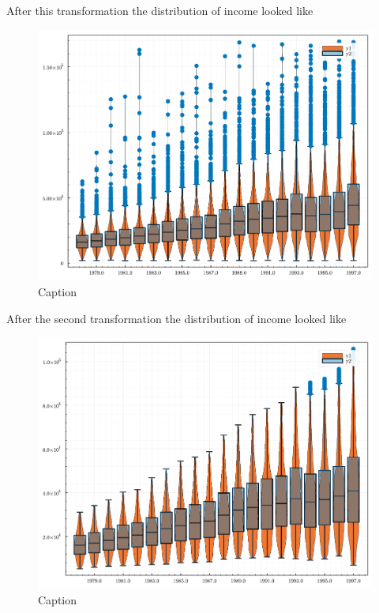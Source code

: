 \documentclass[12pt]{article}
\begin{document}
After this transformation the distribution of income looked like 
\begin{figure}[h*]
    \centering
    \includegraphics[scale = .5]{04 - 2022 Fall/Econ 810 Advanded Macroeconomic Theory/Part 1/PS 1/document/figures/data_outliers.pdf}
    \caption{Caption}
    \label{fig:my_label}

\end{figure}
After the second transformation the distribution of income looked like 
\begin{figure}[h*]
    \centering
    \includegraphics[scale = .5]{04 - 2022 Fall/Econ 810 Advanded Macroeconomic Theory/Part 1/PS 1/document/figures/data_less_outliers.pdf}
    \caption{Caption}
    \label{fig:my_label}
\end{figure}
\end{document}
